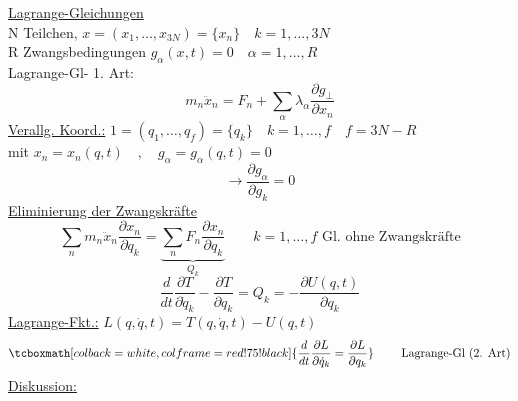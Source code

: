 \documentclass[titlepage,12pt,a4paper,ngerman]{report}
\newcommand{\tx}[1]{\textrm{#1}}
\newcommand{\ub}[1]{\underbrace{#1}}
\newcommand{\rmbox}[1]{\tcboxmath[colback=white,colframe=red!75!black]{#1}} %
\renewcommand{\boxed}{\rmbox}
\begin{document}
{%


\underline{Lagrange-Gleichungen}\\
N Teilchen, $ x = (x_1,\dots,x_{3N}) = \{x_n\}\quad k = 1, \dots , 3N $\\
R Zwangsbedingungen $ g_\alpha (x,t) = 0 \quad \alpha = 1, \dots , R $\\
Lagrange-Gl- 1. Art: 
$$m_n \ddot{x}_n = F_n + \sum_\alpha \lambda_\alpha \frac{\partial g_\perp}{\partial x_n}$$
\underline{Verallg. Koord.:} $ 1 = (q_1,\dots,q_f) = \{ q_k\} \quad k = 1,\dots,f \quad f = 3N - R $\\
mit $ x_n = x_n (q,t) \quad , \quad g_\alpha = g_\alpha(q,t) = 0 $
$$ \rightarrow \frac{\partial g_\alpha}{\partial g_k} = 0 $$
\underline{Eliminierung der Zwangskräfte}
$$\sum_n m_n \ddot{x}_n \frac{\partial x_n}{\partial q_k} = \ub{\sum_n F_n \frac{\partial x_n}{\partial q_k}}_{Q_k} \qquad k = 1, \dots , f \tx{ Gl. ohne Zwangskräfte} $$
$$ \frac{d}{dt} \frac{\partial T}{\partial \dot{q}_k} - \frac{\partial T}{\partial q_k} = Q_k = - \frac{\partial U(q,t)}{\partial q_k}$$
\underline{Lagrange-Fkt.:} $ L(q,\dot{q},t) = T( q, \dot{q},t ) - U(q,t) $
$$ \boxed{\frac{d}{dt} \frac{\partial L}{\partial \dot{q}_k} = \frac{\partial L}{\partial q_k}} \qquad \tx{ Lagrange-Gl (2. Art)}$$
\underline{Diskussion:}\\

}
\end{document}
